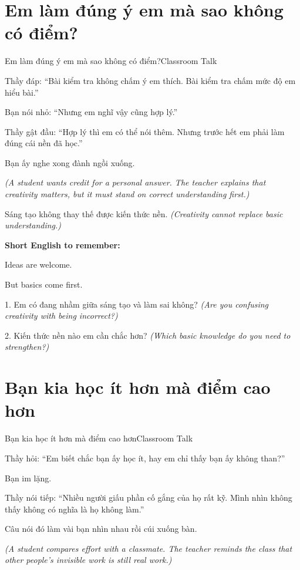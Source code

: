 \section{Em làm đúng ý em mà sao không có điểm?}
\begin{truyen}{Em làm đúng ý em mà sao không có điểm?}{Classroom Talk}

Thầy đáp: ``Bài kiểm tra không chấm ý em thích. Bài kiểm tra chấm mức độ em hiểu bài.''

Bạn nói nhỏ: ``Nhưng em nghĩ vậy cũng hợp lý.''

Thầy gật đầu: ``Hợp lý thì em có thể nói thêm. Nhưng trước hết em phải làm đúng cái nền đã học.''

Bạn ấy nghe xong đành ngồi xuống.

\textit{(A student wants credit for a personal answer. The teacher explains that creativity matters, but it must stand on correct understanding first.)}
\end{truyen}

\begin{baihoc}
Sáng tạo không thay thế được kiến thức nền.
\textit{(Creativity cannot replace basic understanding.)}
\end{baihoc}

\begin{ghinhoanh}
\textbf{Short English to remember:}

Ideas are welcome.

But basics come first.
\end{ghinhoanh}

\begin{tuhocnhanh}
1. Em có đang nhầm giữa sáng tạo và làm sai không? \textit{(Are you confusing creativity with being incorrect?)}

2. Kiến thức nền nào em cần chắc hơn? \textit{(Which basic knowledge do you need to strengthen?)}
\end{tuhocnhanh}
\ngancach

\section{Bạn kia học ít hơn mà điểm cao hơn}
\begin{truyen}{Bạn kia học ít hơn mà điểm cao hơn}{Classroom Talk}

Thầy hỏi: ``Em biết chắc bạn ấy học ít, hay em chỉ thấy bạn ấy không than?''

Bạn im lặng.

Thầy nói tiếp: ``Nhiều người giấu phần cố gắng của họ rất kỹ. Mình nhìn không thấy không có nghĩa là họ không làm.''

Câu nói đó làm vài bạn nhìn nhau rồi cúi xuống bàn.

\textit{(A student compares effort with a classmate. The teacher reminds the class that other people's invisible work is still real work.)}
\end{truyen}

